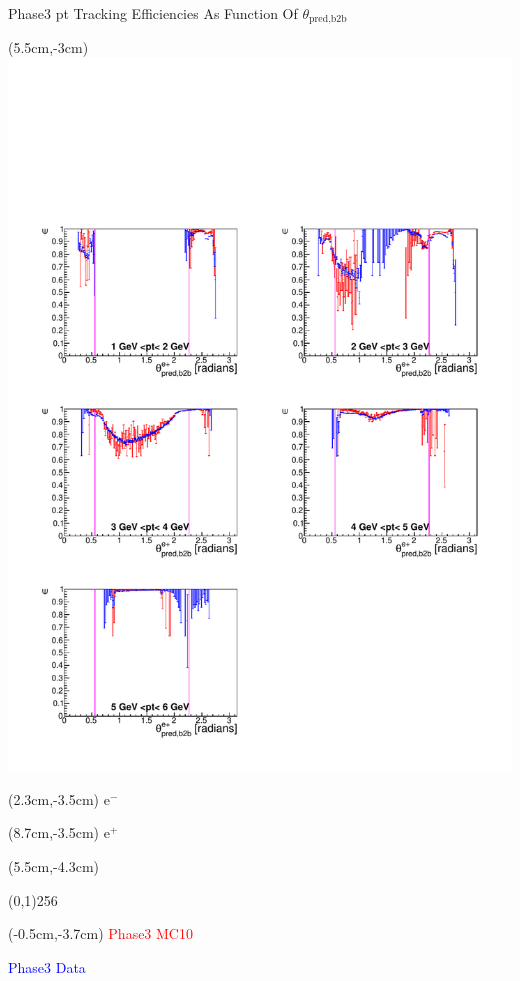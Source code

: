 \documentclass[8pt]{beamer}
\begin{document}
\begin{frame}{Phase3 pt Tracking Efficiencies As Function Of $\theta_{\textrm{pred,b2b}}$}
	\begin{textblock*}{6.5cm}(5.5cm,-3cm)
		\includegraphics[width=\textwidth]{VPlots/P3/xPtMThetaepP3}
	\end{textblock*}
	
	
	\begin{textblock*}{2cm}(2.3cm,-3.5cm)
		$\textrm{e}^-$
	\end{textblock*}
	
	\begin{textblock*}{2cm}(8.7cm,-3.5cm)
		$\textrm{e}^+$
	\end{textblock*}
	
	
	
	\begin{textblock*}{11cm}(5.5cm,-4.3cm)
		
		\begin{center}
			\line(0,1){256}
		\end{center}
		
	\end{textblock*}
	
	\begin{textblock*}{4cm}(-0.5cm,-3.7cm)
		\textcolor{red}{Phase3 MC10}
		
		\textcolor{blue}{Phase3 Data}
	\end{textblock*}
	




\end{frame}
\end{document}
